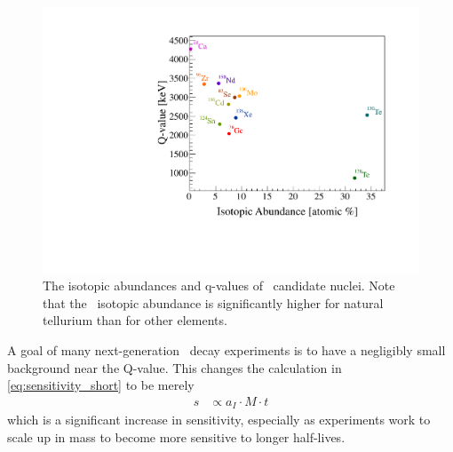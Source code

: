 \begin{figure}[htbp]
    \centering
    \includegraphics[width=0.7\linewidth]{Figures/q_vs_ia-color.pdf}
    \caption[The isotopic abundances and q-values of \zeronubb~candidate nuclei]
    {The isotopic abundances and q-values of \zeronubb~candidate nuclei.
    Note that the \teonethirty~isotopic abundance is significantly higher for natural tellurium than for other elements.}
    \label{fig:q_vs_ia-color}
\end{figure}
A goal of many next-generation \zeronubb~decay experiments is to have a negligibly small background near the Q-value.
This changes the calculation in \autoref{eq:sensitivity_short} to be merely
\begin{align}
    s &\propto a_I \cdot M \cdot t
\end{align}
which is a significant increase in sensitivity, especially as experiments work to scale up in mass to become more sensitive to longer half-lives.

